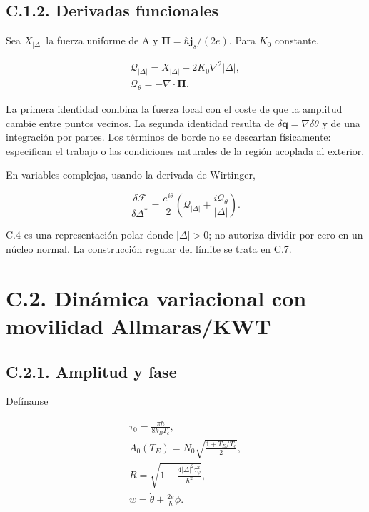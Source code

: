 \documentclass[
  spanish,
  10pt,
  a4paper,
]{article}
\begin{document}
\subsection{C.1.2. Derivadas
funcionales}\label{c.1.2.-derivadas-funcionales}

Sea \(X_{|\Delta|}\) la fuerza uniforme de A y
\(\boldsymbol\Pi=\hbar\mathbf j_s/(2e)\). Para \(K_0\) constante,

\[
\begin{gathered}
\mathcal Q_{|\Delta|}=X_{|\Delta|}-2K_0\nabla^2|\Delta|,\\
\mathcal Q_\theta=-\nabla\cdot\boldsymbol\Pi.
\end{gathered} \tag{C.3}
\]

La primera identidad combina la fuerza local con el coste de que la
amplitud cambie entre puntos vecinos. La segunda identidad resulta de
\(\delta\mathbf q=\nabla\delta\theta\) y de una integración por partes.
Los términos de borde no se descartan físicamente: especifican el
trabajo o las condiciones naturales de la región acoplada al exterior.

En variables complejas, usando la derivada de Wirtinger,

\[
\frac{\delta\mathcal F}{\delta\Delta^*}
=\frac{e^{i\theta}}2\left(\mathcal Q_{|\Delta|}+
\frac{i\mathcal Q_\theta}{|\Delta|}\right). \tag{C.4}
\]

C.4 es una representación polar donde \(|\Delta|>0\); no autoriza
dividir por cero en un núcleo normal. La construcción regular del límite
se trata en C.7.

\section{C.2. Dinámica variacional con movilidad
Allmaras/KWT}\label{c.2.-dinuxe1mica-variacional-con-movilidad-allmaraskwt}

\subsection{C.2.1. Amplitud y fase}\label{c.2.1.-amplitud-y-fase}

Defínanse

\[
\begin{gathered}
\tau_0=\frac{\pi\hbar}{8k_BT_c},\\
A_0(T_E)=N_0\sqrt{\frac{1+T_E/T_c}{2}},\\
R=\sqrt{1+\frac{4|\Delta|^2\tau_\psi^2}{\hbar^2}},\\
w=\dot\theta+\frac{2e}{\hbar}\phi.
\end{gathered} \tag{C.5}
\]
\end{document}
